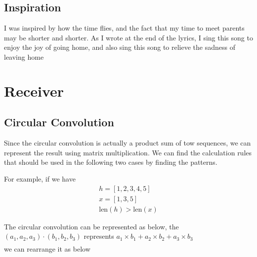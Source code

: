 \documentclass{article}
\begin{document}
\subsection{Inspiration}

I was inspired by how the time flies, and the fact that my time to meet parents may be shorter and shorter. As I wrote at the end of the lyrics, I sing this song to enjoy the joy of going home, and also sing this song to relieve the sadness of leaving home

\section{Receiver}
\subsection{Circular Convolution}

Since the circular convolution is actually a product sum of tow sequences, we can represent the result using matrix multiplication. We can find the calculation rules that should be used in the following two cases by finding the patterns. 

For example, if we have 
\begin{gather*}
	h = [1, 2, 3, 4, 5] \\ 
	x = [1, 3, 5] \\ 
	\mathrm{len}(h) > \mathrm{len}(x)
\end{gather*}

The circular convolution can be represented as below, the $(a_1, a_2, a_3) \cdot (b_1, b_2, b_3)$ represents $a_1\times b_1 + a_2 \times b_2 + a_3 \times b_3$
\begin{align*}
[& \\ 
&(4, 5, 1) \cdot (5, 3, 1) ,\\ 
&(5, 1, 2) \cdot (5, 3, 1), \\ 
&(1, 2, 3) \cdot (5, 3, 1), \\ 
&(2, 3, 4) \cdot (5, 3, 1), \\ 
&(3, 4, 5) \cdot (5, 3, 1) \\ 
]&
\end{align*}
we can rearrange it as below
\begin{align*}
[& \\ 
&(1, 5, 4) \cdot (1, 3, 5) ,\\ 
&(2, 1, 5) \cdot (1, 3, 5), \\ 
&(3, 2, 1) \cdot (1, 3, 5), \\ 
&(4, 3, 2) \cdot (1, 3, 5), \\ 
&(5, 4, 3) \cdot (1, 3, 5) \\ 
]&
\end{align*}
\end{document}
